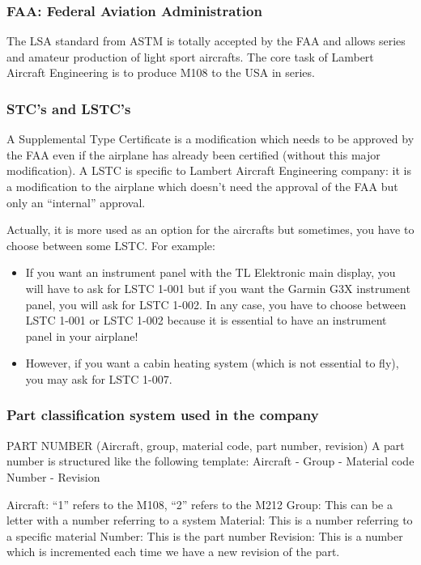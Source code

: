 \documentclass[11pt,a4paper]{article}
\begin{document}
\subsubsection{FAA: Federal Aviation Administration}
The LSA standard from ASTM is totally accepted by the FAA and allows series and amateur production of light sport aircrafts. The core task of Lambert Aircraft Engineering is to produce M108 to the USA in series.

\subsubsection{STC's and LSTC's}
A Supplemental Type Certificate is a modification which needs to be approved by the FAA even if the airplane has already been certified (without this major modification). A LSTC is specific to Lambert Aircraft Engineering company: it is a modification to the airplane which doesn't need the approval of the FAA but only an ``internal'' approval.

\bigskip

Actually, it is more used as an option for the aircrafts but sometimes, you have to choose between some LSTC. For example:
\begin{itemize}
\item If you want an instrument panel with the TL Elektronic main display, you will have to ask for LSTC 1-001 but if you want the Garmin G3X instrument panel, you will ask for LSTC 1-002. In any case, you have to choose between LSTC 1-001 or LSTC 1-002 because it is essential to have an instrument panel in your airplane!
\item However, if you want a cabin heating system (which is not essential to fly), you may ask for LSTC 1-007.
\end{itemize}

\subsubsection{Part classification system used in the company}
PART NUMBER (Aircraft, group, material code, part number, revision)
A part number is structured like the following template:
Aircraft - Group - Material code Number - Revision

Aircraft: ``1'' refers to the M108, ``2'' refers to the M212
Group: This can be a letter with a number referring to a system
Material: This is a number referring to a specific material
Number: This is the part number
Revision: This is a number which is incremented each time we have a new revision of the part.
\end{document}
